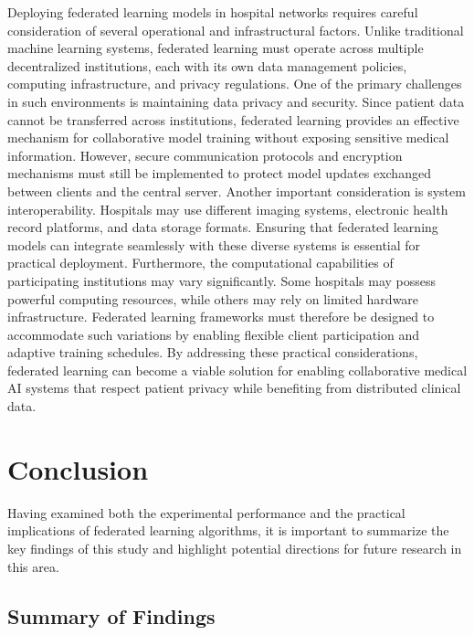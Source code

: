 \documentclass[12pt]{book}
\begin{document}
Deploying federated learning models in hospital networks requires careful consideration of several operational and infrastructural factors. Unlike traditional machine learning systems, federated learning must operate across multiple decentralized institutions, each with its own data management policies, computing infrastructure, and privacy regulations.
One of the primary challenges in such environments is maintaining data privacy and security. Since patient data cannot be transferred across institutions, federated learning provides an effective mechanism for collaborative model training without exposing sensitive medical information. However, secure communication protocols and encryption mechanisms must still be implemented to protect model updates exchanged between clients and the central server.
Another important consideration is system interoperability. Hospitals may use different imaging systems, electronic health record platforms, and data storage formats. Ensuring that federated learning models can integrate seamlessly with these diverse systems is essential for practical deployment.
Furthermore, the computational capabilities of participating institutions may vary significantly. Some hospitals may possess powerful computing resources, while others may rely on limited hardware infrastructure. Federated learning frameworks must therefore be designed to accommodate such variations by enabling flexible client participation and adaptive training schedules.
By addressing these practical considerations, federated learning can become a viable solution for enabling collaborative medical AI systems that respect patient privacy while benefiting from distributed clinical data.



\chapter{Conclusion}
Having examined both the experimental performance and the practical implications of federated learning algorithms, it is important to summarize the key findings of this study and highlight potential directions for future research in this area.


\section{Summary of Findings}
\end{document}
